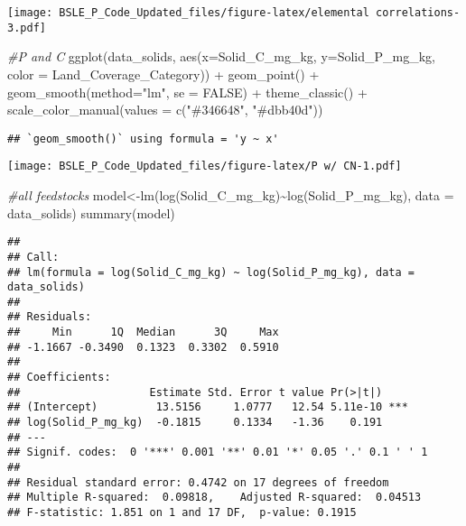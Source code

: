 \documentclass[
]{article}
\newenvironment{Shaded}{\begin{snugshade}}{\end{snugshade}}
\newcommand{\AttributeTok}[1]{\textcolor[rgb]{0.77,0.63,0.00}{#1}}
\newcommand{\CommentTok}[1]{\textcolor[rgb]{0.56,0.35,0.01}{\textit{#1}}}
\newcommand{\ConstantTok}[1]{\textcolor[rgb]{0.00,0.00,0.00}{#1}}
\newcommand{\FunctionTok}[1]{\textcolor[rgb]{0.00,0.00,0.00}{#1}}
\newcommand{\NormalTok}[1]{#1}
\newcommand{\OtherTok}[1]{\textcolor[rgb]{0.56,0.35,0.01}{#1}}
\newcommand{\SpecialCharTok}[1]{\textcolor[rgb]{0.00,0.00,0.00}{#1}}
\newcommand{\StringTok}[1]{\textcolor[rgb]{0.31,0.60,0.02}{#1}}
\begin{document}
\texttt{[image: BSLE\_P\_Code\_Updated\_files/figure-latex/elemental correlations-3.pdf]}

\begin{Shaded}
\begin{Highlighting}[]
\CommentTok{\#P and C}
\FunctionTok{ggplot}\NormalTok{(data\_solids, }\FunctionTok{aes}\NormalTok{(}\AttributeTok{x=}\NormalTok{Solid\_C\_mg\_kg, }\AttributeTok{y=}\NormalTok{Solid\_P\_mg\_kg, }\AttributeTok{color =}\NormalTok{ Land\_Coverage\_Category)) }\SpecialCharTok{+} \FunctionTok{geom\_point}\NormalTok{() }\SpecialCharTok{+} \FunctionTok{geom\_smooth}\NormalTok{(}\AttributeTok{method=}\StringTok{"lm"}\NormalTok{, }\AttributeTok{se =} \ConstantTok{FALSE}\NormalTok{) }\SpecialCharTok{+} \FunctionTok{theme\_classic}\NormalTok{() }\SpecialCharTok{+} \FunctionTok{scale\_color\_manual}\NormalTok{(}\AttributeTok{values =} \FunctionTok{c}\NormalTok{(}\StringTok{"\#346648"}\NormalTok{, }\StringTok{"\#dbb40d"}\NormalTok{))}
\end{Highlighting}
\end{Shaded}

\begin{verbatim}
## `geom_smooth()` using formula = 'y ~ x'
\end{verbatim}

\texttt{[image: BSLE\_P\_Code\_Updated\_files/figure-latex/P w/ CN-1.pdf]}

\begin{Shaded}
\begin{Highlighting}[]
\CommentTok{\#all feedstocks}
\NormalTok{model}\OtherTok{\textless{}{-}}\FunctionTok{lm}\NormalTok{(}\FunctionTok{log}\NormalTok{(Solid\_C\_mg\_kg)}\SpecialCharTok{\textasciitilde{}}\FunctionTok{log}\NormalTok{(Solid\_P\_mg\_kg), }\AttributeTok{data =}\NormalTok{ data\_solids)}
\FunctionTok{summary}\NormalTok{(model)}
\end{Highlighting}
\end{Shaded}

\begin{verbatim}
## 
## Call:
## lm(formula = log(Solid_C_mg_kg) ~ log(Solid_P_mg_kg), data = data_solids)
## 
## Residuals:
##     Min      1Q  Median      3Q     Max 
## -1.1667 -0.3490  0.1323  0.3302  0.5910 
## 
## Coefficients:
##                    Estimate Std. Error t value Pr(>|t|)    
## (Intercept)         13.5156     1.0777   12.54 5.11e-10 ***
## log(Solid_P_mg_kg)  -0.1815     0.1334   -1.36    0.191    
## ---
## Signif. codes:  0 '***' 0.001 '**' 0.01 '*' 0.05 '.' 0.1 ' ' 1
## 
## Residual standard error: 0.4742 on 17 degrees of freedom
## Multiple R-squared:  0.09818,    Adjusted R-squared:  0.04513 
## F-statistic: 1.851 on 1 and 17 DF,  p-value: 0.1915
\end{verbatim}
\end{document}
